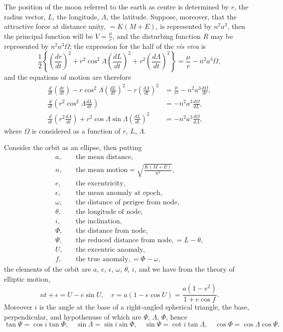 \documentclass[11pt,a4paper]{book}
\begin{document}
The position of the moon referred to the earth as centre is determined by $r$, the radius vector, $L$, the longitude, $\Lambda$, the latitude. Suppose, moreover, that the attractive force at distance unity, $= K(M+E)$, is represented by $n^2a^3$, then the principal function will be $V = \frac{\mu}{r}$, and the disturbing function $R$ may be represented by $n^2a^3\Omega$; the expression for the half of the \textit{vis viva} is
\[
\frac{1}{2}\left\{\left(\frac{dr}{dt}\right)^2 + r^2\cos^2\Lambda\left(\frac{dL}{dt}\right)^2 + r^2\left(\frac{d\Lambda}{dt}\right)^2\right\} = \frac{\mu}{r} - n^2a^3\Omega,
\]
and the equations of motion are therefore
\begin{align*}
\frac{d}{dt}\left(\frac{dr}{dt}\right) - r\cos^2\Lambda\left(\frac{dL}{dt}\right)^2 - r\left(\frac{d\Lambda}{dt}\right)^2 &= \frac{\mu}{r^2} - n^2a^3\frac{d\Omega}{dr}, \\
\frac{d}{dt}\left(r^2\cos^2\Lambda\frac{dL}{dt}\right) &= -n^2a^3\frac{d\Omega}{dL}, \\
\frac{d}{dt}\left(r^2\frac{d\Lambda}{dt}\right) + r^2\cos\Lambda\sin\Lambda\left(\frac{dL}{dt}\right)^2 &= -n^2a^3\frac{d\Omega}{d\Lambda},
\end{align*}
where $\Omega$ is considered as a function of $r$, $L$, $\Lambda$.

Consider the orbit as an ellipse, then putting
\begin{align*}
a, \quad &\text{the mean distance}, \\
n, \quad &\text{the mean motion} = \sqrt{\frac{K(M+E)}{a^3}}, \\
e, \quad &\text{the excentricity}, \\
\epsilon, \quad &\text{the mean anomaly at epoch}, \\
\omega, \quad &\text{the distance of perigee from node}, \\
\theta, \quad &\text{the longitude of node}, \\
i, \quad &\text{the inclination}, \\
\Phi, \quad &\text{the distance from node}, \\
\Psi, \quad &\text{the reduced distance from node}, = L - \theta, \\
U, \quad &\text{the excentric anomaly}, \\
f, \quad &\text{the true anomaly}, = \Phi - \omega,
\end{align*}
the elements of the orbit are $a$, $e$, $\epsilon$, $\omega$, $\theta$, $i$, and we have from the theory of elliptic motion,
\[
nt + \epsilon = U - e\sin U, \quad r = a(1 - e\cos U) = \frac{a(1-e^2)}{1+e\cos f}.
\]
Moreover $i$ is the angle at the base of a right-angled spherical triangle, the base, perpendicular, and hypothenuse of which are $\Psi$, $\Lambda$, $\Phi$, hence
\[
\tan\Psi = \cos i\tan\Phi, \quad \sin\Lambda = \sin i\sin\Phi, \quad \sin\Psi = \cot i\tan\Lambda, \quad \cos\Phi = \cos\Lambda\cos\Psi.
\]
\end{document}

